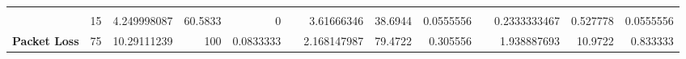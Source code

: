 \begin{table*}[]
{\begin{tabular}{lrrrrlrrrlrrr}
                     & \multicolumn{1}{l}{}      & \multicolumn{1}{l}{}                                                            & \multicolumn{1}{l}{}                                                            & \multicolumn{1}{l}{}                                                            &           & \multicolumn{1}{l}{}                                                            & \multicolumn{1}{l}{}                                                            & \multicolumn{1}{l}{}                                                            &           & \multicolumn{1}{l}{}                                                            & \multicolumn{1}{l}{}                                                            & \multicolumn{1}{l}{}                                                            \\
                     & 15                        & 4.249998087                                                                     & 60.5833                                                                         & 0                                                                               &           & 3.61666346                                                                      & 38.6944                                                                         & 0.0555556                                                                       &           & 0.2333333467                                                                    & 0.527778                                                                        & 0.0555556                                                                       \\
\textbf{Packet Loss} & 75                        & 10.29111239                                                                     & 100                                                                             & 0.0833333                                                                       &           & 2.168147987                                                                     & 79.4722                                                                         & 0.305556                                                                        &           & 1.938887693                                                                     & 10.9722                                                                         & 0.833333                                                                        \\

\end{tabular}}
\end{table*}
